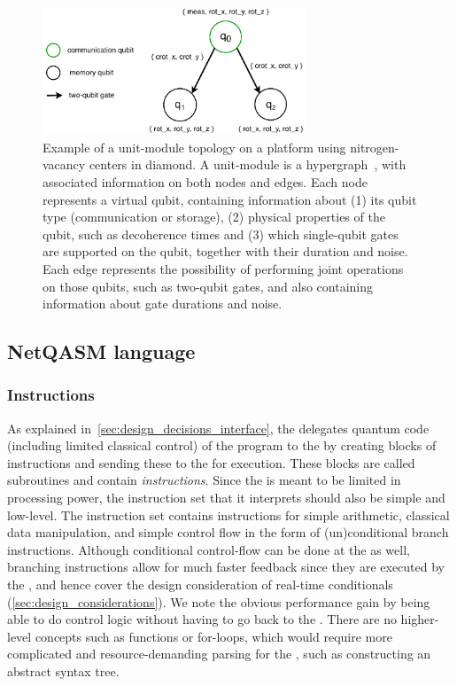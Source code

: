 \begin{figure}
      \centering
      \includegraphics[width=0.7\textwidth]{figures/netqasm/unit-module.pdf}
      \caption{Example of a unit-module topology on a platform using
            nitrogen-vacancy centers in diamond. A unit-module is a
            hypergraph~\cite{berge1984hypergraphs}, with associated information
            on both nodes and edges. Each node represents a virtual qubit,
            containing information about (1) its qubit type (communication or
            storage), (2) physical properties of the qubit, such as decoherence
            times and (3) which single-qubit gates are supported on the qubit,
            together with their duration and noise. Each edge represents the
            possibility of performing joint operations on those qubits, such as
            two-qubit gates, and also containing information about gate
            durations and noise.}\label{fig:topology}
\end{figure}



\subsection{NetQASM language}

\subsubsection{Instructions}
\label{sec:design_decisions_language}
As explained in~\cref{sec:design_decisions_interface}, the \host delegates quantum code (including limited classical control) of the program to the \QNPU by creating blocks of instructions and sending these to the \QNPU for execution.
These blocks are called subroutines and contain \netqasm \textit{instructions}.
Since the \QNPU is meant to be limited in processing power, the instruction set that it interprets should also be simple and low-level.
The \netqasm instruction set contains instructions for simple arithmetic, classical data manipulation, and simple control flow in the form of (un)conditional branch instructions.
Although conditional control-flow can be done at the \host as well, \netqasm branching instructions allow for much faster feedback since they are executed by the \QNPU, and hence cover the design consideration of real-time conditionals (\cref{sec:design_considerations}).
We note the obvious performance gain by being able to do control logic without having to go back to the \host.
There are no higher-level concepts such as functions or for-loops, which would require more complicated and resource-demanding parsing for the \QNPU, such as constructing an abstract syntax tree.

